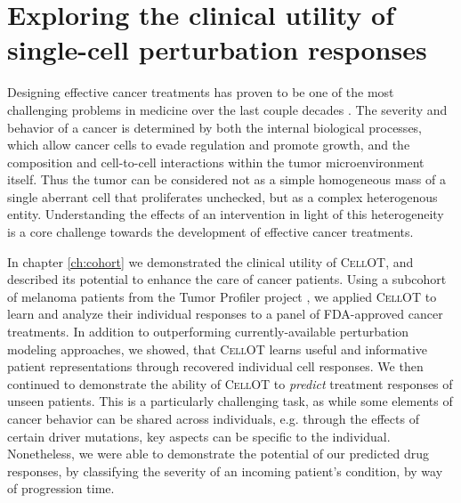 \section{Exploring the clinical utility of single-cell perturbation responses}
Designing effective cancer treatments has proven to be one of the most challenging problems in medicine over the last couple decades \cite{}.
The severity and behavior of a cancer is determined by both the internal biological processes, which allow cancer cells to evade regulation and promote growth, and the composition and cell-to-cell interactions within the tumor microenvironment itself.
Thus the tumor can be considered not as a simple homogeneous mass of a single aberrant cell that proliferates unchecked, but as a complex heterogenous entity.
Understanding the effects of an intervention in light of this heterogeneity is a core challenge towards the development of effective cancer treatments.

In chapter \ref{ch:cohort} we demonstrated the clinical utility of \textsc{CellOT},
and described its potential to enhance the care of cancer patients.
Using a subcohort of melanoma patients from the Tumor Profiler project \cite{irmisch2020},
we applied \textsc{CellOT} to learn and analyze their individual responses to a panel of FDA-approved cancer treatments.
In addition to outperforming currently-available perturbation modeling approaches, we showed, that \textsc{CellOT} learns useful and informative patient representations through recovered individual cell responses.
We then continued to demonstrate the ability of \textsc{CellOT} to \emph{predict} treatment responses of unseen patients.
This is a particularly challenging task, as while some elements of cancer behavior can be shared across individuals, e.g. through the effects of certain driver mutations, key aspects can be specific to the individual.
Nonetheless, we were able to demonstrate the potential of our predicted drug responses,
by classifying the severity of an incoming patient's condition, by way of progression time.


